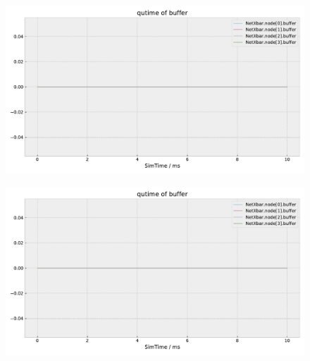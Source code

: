 \documentclass[]{scrartcl}
\begin{document}
\begin{figure}[ht]
    \centering
    \includegraphics[width=\columnwidth, page=7]{../../python/results/postopt-General-0}
    \caption{}%
    \label{fig:postopt-arbiter-qtime}
\end{figure}
\begin{figure}[ht]
    \centering
    \includegraphics[width=\columnwidth, page=6]{../../python/results/postopt-General-0}
    \caption{}%
    \label{fig:postopt-outbuf-qtime}
\end{figure}
\end{document}
